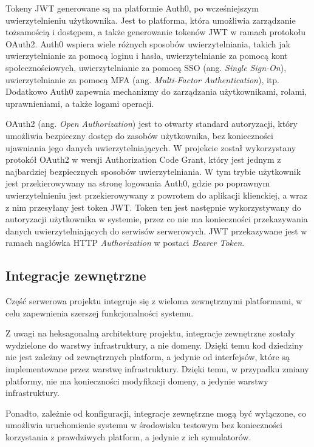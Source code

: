 Tokeny JWT generowane są na platformie Auth0, po wcześniejszym uwierzytelnieniu użytkownika. Jest to platforma, która umożliwia zarządzanie tożsamością i dostępem, a także generowanie tokenów JWT w ramach protokołu OAuth2. Auth0 wspiera wiele różnych sposobów uwierzytelniania, takich jak uwierzytelnianie za pomocą loginu i hasła, uwierzytelnianie za pomocą kont społecznościowych, uwierzytelnianie za pomocą SSO (ang. \textit{Single Sign-On}), uwierzytelnianie za pomocą MFA (ang. \textit{Multi-Factor Authentication}), itp. Dodatkowo Auth0 zapewnia mechanizmy do zarządzania użytkownikami, rolami, uprawnieniami, a także logami operacji.

OAuth2 (ang. \textit{Open Authorization}) jest to otwarty standard autoryzacji, który umożliwia bezpieczny dostęp do zasobów użytkownika, bez konieczności ujawniania jego danych uwierzytelniających. W projekcie został wykorzystany protokół OAuth2 w wersji Authorization Code Grant, który jest jednym z najbardziej bezpiecznych sposobów uwierzytelniania. W tym trybie użytkownik jest przekierowywany na stronę logowania Auth0, gdzie po poprawnym uwierzytelnieniu jest przekierowywany z powrotem do aplikacji klienckiej, a wraz z nim przesyłany jest token JWT. Token ten jest następnie wykorzystywany do autoryzacji użytkownika w systemie, przez co nie ma konieczności przekazywania danych uwierzytelniających do serwisów serwerowych. JWT przekazywane jest w ramach nagłówka HTTP \textit{Authorization} w postaci \textit{Bearer Token}.

\subsection{Integracje zewnętrzne}

Część serwerowa projektu integruje się z wieloma zewnętrznymi platformami, w celu zapewnienia szerszej funkcjonalności systemu. 

Z uwagi na heksagonalną architekturę projektu, integracje zewnętrzne zostały wydzielone do warstwy infrastruktury, a nie domeny. Dzięki temu kod dziedziny nie jest zależny od zewnętrznych platform, a jedynie od interfejsów, które są implementowane przez warstwę infrastruktury. Dzięki temu, w przypadku zmiany platformy, nie ma konieczności modyfikacji domeny, a jedynie warstwy infrastruktury. 

Ponadto, zależnie od konfiguracji, integracje zewnętrzne mogą być wyłączone, co umożliwia uruchomienie systemu w środowisku testowym bez konieczności korzystania z prawdziwych platform, a jedynie z ich symulatorów.

